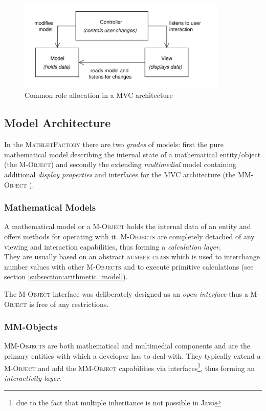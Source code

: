 \documentclass[a4paper,12pt]{article}
\newcommand{\name}[1]{\textsc{#1}}
\newcommand{\mf}{\name{MathletFactory }}
\newcommand{\nc}{\name{number class }}
\newcommand{\mo}{\name{M-Object }}
\newcommand{\mos}{\name{M-Objects }}
\newcommand{\mmo}{\name{MM-Object }}
\newcommand{\mmos}{\name{MM-Objects }}
\begin{document}
\begin{figure}[h]
  \begin{center}
    \includegraphics[width=10cm]
      {images/mvc_common.pdf}
    \caption{Common role allocation in a MVC architecture}
    \label{fig:mvc_common}
  \end{center}
\end{figure}

\subsection{Model Architecture}

In the \mf there are two \textit{grades} of models: first the pure mathematical model describing the internal
state of a mathematical entity/object (the \name{M-Object}) and secondly the extending \textit{multimedial} 
model containing additional \textit{display properties} and interfaces for the MVC architecture (the \mmo).

\subsubsection*{Mathematical Models}

A mathematical model or a \mo holds the internal data of an entity and offers methods for operating with it.
\mos are completely detached of any viewing and interaction capabilities, thus forming a \textit{calculation layer}.\\
They are usually based on an abstract \nc which is used to interchange number values with other \mos and 
to execute primitive calculations (see section \ref{subsection:arithmetic_model}).

The \mo interface was deliberately designed as an \textit{open interface} thus a \mo is free of any restrictions.


\subsubsection*{MM-Objects}

\mmos are both mathematical and multimedial components and are the primary entities with which a developer 
has to deal with. They typically extend a \mo and add the \mmo capabilities via interfaces\footnote{due to the 
fact that multiple inheritance is not possible in Java}, thus forming an \textit{interactivity layer}.
\end{document}
